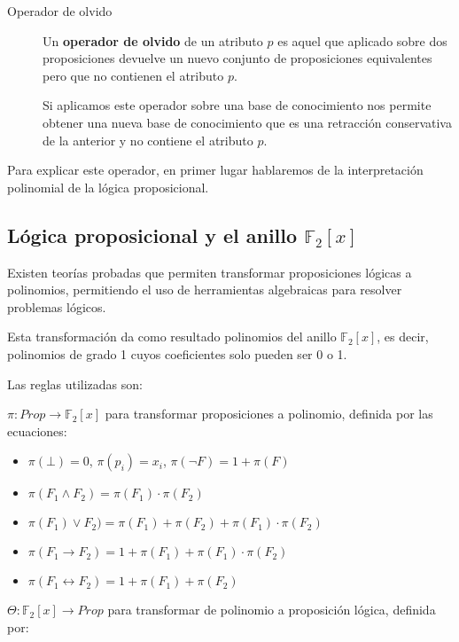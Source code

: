 	 \begin{description}
	 	\item[Operador de olvido]  	
	 	Un \textbf{operador de olvido} de un atributo $p$ es aquel que aplicado sobre dos proposiciones devuelve un 
	 	nuevo conjunto de proposiciones equivalentes pero que no contienen el atributo $p$.
	 	
	 	Si aplicamos este operador sobre una base de conocimiento
	 	nos permite obtener una nueva base de conocimiento que es una retracción conservativa de la anterior y no contiene el atributo $p$.
	 \end{description}
	 
	 Para explicar este operador, en primer lugar hablaremos de la interpretación polinomial de la lógica proposicional.
	 
	 \subsection*{Lógica proposicional y el anillo $\mathbb{F}_2[x]$}
	 	
	 	Existen teorías probadas que permiten transformar proposiciones lógicas a polinomios, permitiendo el uso de herramientas algebraicas para resolver problemas lógicos.
	 	
	 	Esta transformación da como resultado polinomios del anillo  $\mathbb{F}_2[x]$, es decir, polinomios de grado 1 cuyos coeficientes solo pueden ser 0 o 1.
	 	
	 	Las reglas utilizadas son:
	 	
	 	$\pi: Prop \to \mathbb{F}_2[x]$ para transformar proposiciones a polinomio, definida por las ecuaciones:
	 	
	 	\begin{itemize}
	 		\item $\pi(\bot) = 0$, $\pi(p_i) = x_i$, $\pi(\neg F) = 1 + \pi(F)$
	 		\item $\pi(F_1 \wedge F_2) = \pi(F_1) \cdot \pi(F_2)$
	 		\item $\pi(F_1) \vee F_2) = \pi(F_1) + \pi(F_2) + \pi(F_1) \cdot \pi(F_2)$
	 		\item $\pi(F_1 \to F_2) = 1 + \pi(F_1) + \pi(F_1) \cdot \pi(F_2)$
	 		\item $\pi(F_1 \leftrightarrow F_2) = 1 + \pi(F_1) + \pi(F_2)$
	 	\end{itemize}
 	
 		$\Theta: \mathbb{F}_2[x] \to Prop$ para transformar de polinomio a proposición lógica, definida por:
 		
